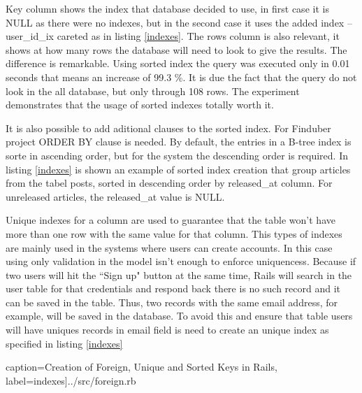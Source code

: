 \vspace{10 pt}

Key column shows the index that database decided to use, in first case it is NULL as there were no indexes, but in the second case it uses the added index -- user\_id\_ix careted as in listing \ref{indexes}. The rows column is also relevant, it shows at how many rows the database will need to look to give the results. 
The difference is remarkable. Using sorted index the query was executed only in 0.01 seconds that means an increase of 99.3 \%. It is due the fact that the query do not look in the all database, but only through  108 rows. The experiment demonstrates that the usage of sorted indexes totally worth it. 

It is also possible to add aditional clauses to the sorted index. For Finduber project ORDER BY clause is needed. By default, the entries in a B-tree index is sorte in ascending order, but for the system the descending order is required. In listing \ref{indexes} is shown an example of sorted index creation that group articles from the tabel posts, sorted in descending order by released\_at column. For unreleased articles, the released\_at value is NULL.

Unique indexes for a column are used to guarantee that the table won't have more than one row with the same value for that column. This types of indexes are mainly used in the systems where users can create accounts. In this case using only validation in the model isn't enough to enforce uniquencess. Because if two users will hit the ``Sign up" button at the same time, Rails will search in the user table for that credentials and respond back there is no such record and it can be saved in the table. Thus, two records with the same email address, for example, will be saved in the database. To avoid this and ensure that table users will have uniques records in email field is need to create an unique index as specified in listing \ref{indexes}

 caption={Creation of Foreign, Unique and Sorted Keys in Rails}, label=indexes]{../src/foreign.rb} 















